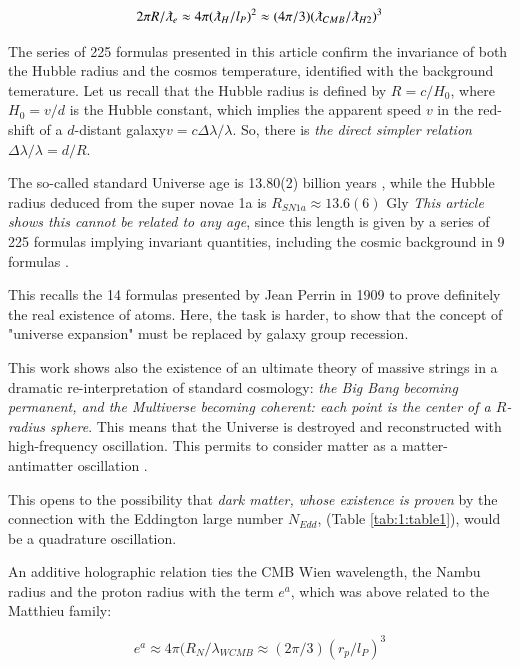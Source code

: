 \documentclass[a4paper,9pt]{article}
\begin{document}
    \begin{equation}
        2\pi R/\lambdabar_e \approx 4\pi (\lambdabar_H/l_P)^2 \approx (4\pi/3) (\lambdabar_{CMB}/\lambdabar_{H2})^3
    \end{equation}

    The series of 225 formulas presented in this article confirm the invariance of both the Hubble radius and the cosmos temperature, identified with the background temerature. Let us recall that the Hubble radius is defined by $R = c/H_0$, where $H_0 = v/d$ is the Hubble constant, which implies the apparent speed $v$ in the red-shift of a $d$-distant galaxy$ v = c \Delta \lambda/\lambda$. So, there is \textit {the direct simpler relation} $\Delta \lambda/\lambda =  d/R$. 
    

    
    The so-called standard Universe age is 13.80(2) billion years \cite{Tanabashi}, while the Hubble radius deduced from the super novae 1a is $R_{SN1a} \approx 13.6(6)$ Gly \cite{Friedman}\textit{This article shows this cannot be related to any age}, since this length is given by a series of 225 formulas implying invariant quantities, including the cosmic background in 9 formulas . 
    
    
    This recalls the 14 formulas presented by Jean Perrin in 1909 to prove definitely the real existence of atoms. Here, the task is 
harder, to show that the concept of "universe expansion" must be replaced by galaxy group recession.    
    
    
    This work shows also the existence of an ultimate theory of massive strings in a dramatic re-interpretation of standard cosmology:\textit{ the Big Bang becoming permanent, and the Multiverse becoming coherent: each point is the center of a $R$-radius sphere}. This means that the Universe is destroyed and reconstructed with high-frequency oscillation. This permits to consider matter as a matter-antimatter oscillation \cite{Sanchez2}. 
    
    This opens to the possibility that \textit {dark matter, whose existence is proven} by the connection with the Eddington large number $N_{Edd}$, (Table \ref{tab:1:table1}), would be a quadrature oscillation.

An additive holographic relation ties the CMB Wien wavelength, the Nambu radius and the proton radius with the term $e^a$, which was above related to the Matthieu family:

\begin{equation}
       e^a \approx 4\pi (R_N/\lambda_{WCMB} \approx (2\pi/3) (r_p/l_P)^3
    \end{equation}
\end{document}
